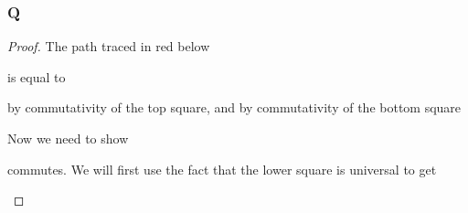 \documentclass{article}
\begin{document}
\subsubsection{Q}\label{1.3.Q}
\begin{proof}
    The path traced in red below
    \begin{center}
    \end{center}
    is equal to
    \begin{center}
    \end{center}
    by commutativity of the top square, and by commutativity of the bottom square 
    \begin{center}
    \end{center}
    Now we need to show 
    \begin{center}
    \end{center}
    commutes. We will first use the fact that the lower square is universal to get
    \begin{center}
\end{center}
\end{proof}
\end{document}
